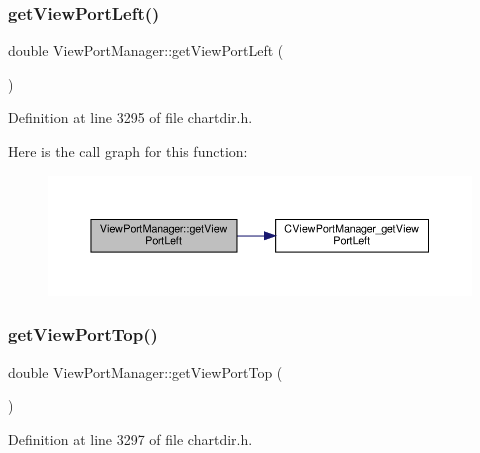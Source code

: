 \subsubsection{\texorpdfstring{get\+View\+Port\+Left()}{getViewPortLeft()}}
{\footnotesize\ttfamily double View\+Port\+Manager\+::get\+View\+Port\+Left (\begin{DoxyParamCaption}{ }\end{DoxyParamCaption})\hspace{0.3cm}{\ttfamily [inline]}}



Definition at line 3295 of file chartdir.\+h.

Here is the call graph for this function\+:
\nopagebreak
\begin{figure}[H]
\begin{center}
\leavevmode
\includegraphics[width=350pt]{class_view_port_manager_a39d80abc4db236ff6657c5974e1a9fda_cgraph}
\end{center}
\end{figure}
\mbox{\label{class_view_port_manager_a83c46dea64613c2e1939933eb6ae17c0}} 
\subsubsection{\texorpdfstring{get\+View\+Port\+Top()}{getViewPortTop()}}
{\footnotesize\ttfamily double View\+Port\+Manager\+::get\+View\+Port\+Top (\begin{DoxyParamCaption}{ }\end{DoxyParamCaption})\hspace{0.3cm}{\ttfamily [inline]}}



Definition at line 3297 of file chartdir.\+h.

